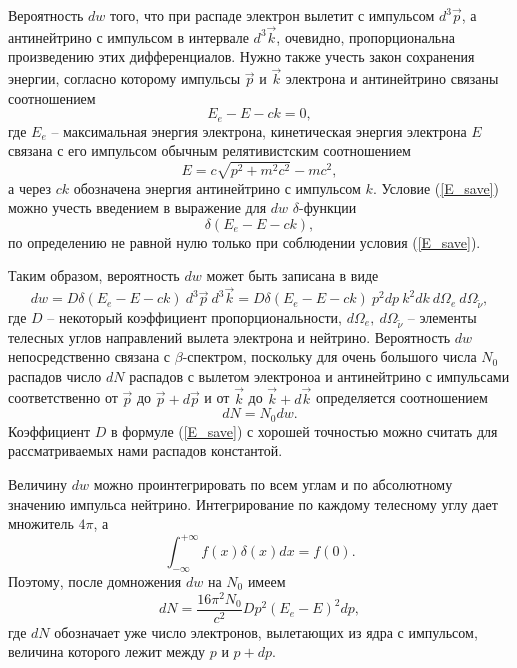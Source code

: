 \documentclass{lab}
\begin{document}
	Вероятность $dw$ того, что при распаде электрон вылетит с импульсом $d^3 \vec{p}$, а антинейтрино с импульсом в интервале $d^3 \vec{k}$, очевидно, пропорциональна произведению этих дифференциалов. Нужно также учесть закон сохранения энергии, согласно которому импульсы $\vec{p}$ и $\vec{k}$ электрона и антинейтрино связаны соотношением 
	\begin{equation} \label{E_save}
	E_e - E - ck = 0,
	\end{equation}
	где $E_e$ -- максимальная энергия электрона, кинетическая энергия электрона $E$ связана с его импульсом обычным релятивистским соотношением 
	\begin{equation}
	E = c \sqrt{p^2 + m^2 c^2} - m c^2, 
	\end{equation}
	а через $ck$ обозначена энергия антинейтрино с импульсом $k$. Условие (\ref{E_save}) можно учесть введением в выражение для $dw$ $\delta$-функции
	\begin{equation}
	\delta (E_e - E - ck), 
	\end{equation}
	по определению не равной нулю только при соблюдении условия (\ref{E_save}).
	
	Таким образом, вероятность $dw$ может быть записана в виде
	\begin{equation}
	dw = D \delta (E_e - E - ck) \  d^3 \vec{p} \  d^3 \vec{k} =  D \delta (E_e - E - ck) \ p^2 dp \ k^2 dk \ d\Omega_e \ d\Omega_{\tilde \nu}, 
	\end{equation}
	где $D$ -- некоторый коэффициент пропорциональности, $d\Omega_e,\ d\Omega_{\tilde \nu}$ -- элементы телесных углов направлений вылета электрона и нейтрино. Вероятность $dw$ непосредственно связана с $\beta$-спектром, поскольку для очень большого числа $N_0$ распадов число $dN$ распадов с вылетом электроноа и антинейтрино с импульсами соответственно от $\vec{p}$ до $\vec{p} + d\vec{p}$ и от $\vec{k}$ до $\vec{k} + d\vec{k}$ определяется соотношением 
	\begin{equation}
	dN = N_0 dw.
	\end{equation}
	Коэффициент $D$ в формуле (\ref{E_save}) с хорошей точностью можно считать для рассматриваемых нами распадов константой.
	
	Величину $dw$ можно проинтегрировать по всем углам и по абсолютному значению импульса нейтрино. Интегрирование по каждому телесному углу дает множитель $4 \pi$, а 
	\begin{equation}
	\int_{- \infty} ^{+ \infty} f(x) \delta (x) dx = f(0).
	\end{equation}
	Поэтому, после домножения $dw$ на $N_0$ имеем
	\begin{equation} \label{p-dist}
	dN = \frac{16 \pi^2 N_0}{c^2}Dp^2(E_e - E)^2 dp, 
	\end{equation}
	где $dN$ обозначает уже число электронов, вылетающих из ядра с импульсом, величина которого лежит между $p$  и $p + dp$.
	
\end{document}
